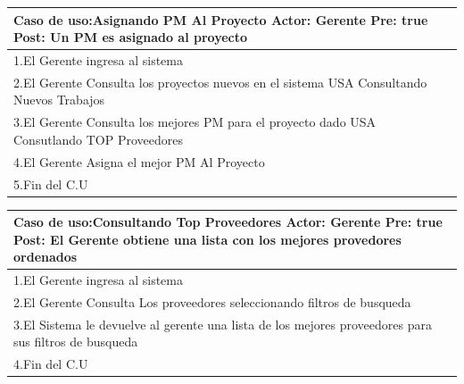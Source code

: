 \begin{longtable}{|p{}|p{}|}
    \hline
    \multicolumn{2}{|p{16cm}|}{
        \textbf{Caso de uso:}Asignando PM Al Proyecto\newline
        \textbf{Actor:} Gerente\newline
        \textbf{Pre: }true\newline
        \textbf{Post:} Un PM es asignado al proyecto
    }\\
    \hline
    1.El Gerente ingresa al sistema & \\
    \hline
    2.El Gerente Consulta los proyectos nuevos en el sistema USA Consultando Nuevos Trabajos&    \\
    \hline
    3.El Gerente Consulta los mejores PM para el proyecto dado USA Consutlando TOP Proveedores& \\
    \hline
    4.El Gerente Asigna el mejor PM Al Proyecto&\\
    \hline
    5.Fin del C.U&\\
    \hline
\end{longtable}


\begin{longtable}{|p{}|p{}|}
    \hline
    \multicolumn{2}{|p{16cm}|}{
        \textbf{Caso de uso:}Consultando Top Proveedores\newline
        \textbf{Actor:} Gerente\newline
        \textbf{Pre: }true\newline
        \textbf{Post:}  El Gerente obtiene una lista con los mejores provedores ordenados
    }\\
    \hline
    1.El Gerente ingresa al sistema & \\
    \hline
    2.El Gerente Consulta Los proveedores seleccionando filtros de busqueda&    \\
    \hline
    3.El Sistema le devuelve al gerente una lista de los mejores proveedores para sus filtros de busqueda& \\
    \hline
    4.Fin del C.U&\\
    \hline
\end{longtable}


